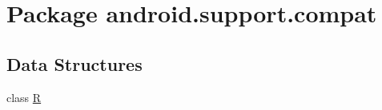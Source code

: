 \hypertarget{namespaceandroid_1_1support_1_1compat}{}\section{Package android.\+support.\+compat}
\label{namespaceandroid_1_1support_1_1compat}
\subsection*{Data Structures}
\begin{DoxyCompactItemize}
\item 
class \mbox{\hyperlink{classandroid_1_1support_1_1compat_1_1_r}{R}}
\end{DoxyCompactItemize}
